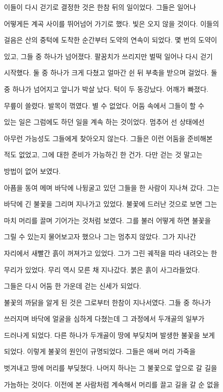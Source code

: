이들이 다시 걷기로 결정한 것은 한참 뒤의 일이었다. 그들은 일어나

어떻게든 계곡 사이를 뛰어넘어 가기로 했다. 빛은 오지 않을 것이다. 이들의

걸음은 산의 중턱에 도착한 순간부터 도약의 연속이 되었다. 몇 번의 도약이

있고, 그들 중 하나가 넘어졌다. 팔꿈치가 쓰리지만 벌떡 일어나 다시 걷기

시작했다. 둘 중 하나가 크게 다쳤고 얼마간 쉰 뒤 부축을 받으며 걸었다. 둘

중 하나가 넘어지고 앞니가 박살 났다. 턱이 두 동강났다. 어깨가 빠졌다.

무릎이 쓸렸다. 발목이 꺾였다. 별 수 없었다. 어둠 속에서 그들이 할 수

있는 일은 그럼에도 하던 일을 계속 하는 것이었다. 멈추어 선 상태에선

아무런 가능성도 그들에게 찾아오지 않는다. 그들은 이런 어둠을 준비해본

적도 없었고, 그에 대한 준비가 가능하긴 한 건가. 다만 걷는 것 말고는

방법이 없어 보였다.



아픔을 동여 메며 바닥에 나뒹굴고 있던 그들을 한 사람이 지나쳐 갔다. 그는

바닥에 긴 불꽃을 그리며 지나가고 있었다. 불꽃에 드러난 것으로 보면 그는

마치 머리를 끌며 기어가는 것처럼 보였다. 그를 불러 어떻게 하면 불꽃을

그릴 수 있는지 물어보고자 했으나 그는 멈추지 않았다. 그가 지나간

자리에서 새빨간 흙이 꺼져가고 있었다. 그가 그린 궤적을 따라 내려오는 한

무리가 있었다. 무리 역시 모른 채 지나갔다. 붉은 흙이 사그라들었다.

그들은 다시 어둠 한 가운데 걷는 신세가 되었다.



불꽃의 까닭을 알게 된 것은 그로부터 한참이 지나서였다. 그들 중 하나가

쓰러지며 바닥에 얼굴을 심하게 다쳤는데 그 과정에서 두개골의 일부가

드러나게 되었다. 다른 하나가 두개골이 땅에 부딪치며 발생한 불꽃을 보게

되었다. 이렇게 불꽃의 원인이 규명되었다. 그들은 애써 머리 가죽을

벗겨내고 땅에 머리를 부딪쳤다. 나머지 하나는 그 불꽃으로 앞으로 갈 길을

가늠하는 것이다. 이전에 본 사람처럼 계속해서 머리를 끌고 길을 갈 순 없을

